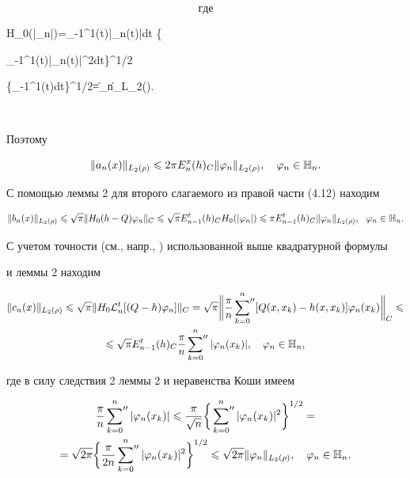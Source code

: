 $$


где


$$


H_0(|\vp_n|)=\int_{-1}^1\rho(t)|\vp_n(t)|dt \lea \bigg\{


\int_{-1}^{1}\rho(t)|\vp_n(t)|^2dt\bigg\}^{1/2}


\bigg\{\int_{-1}^1\rho(t)dt\bigg\}^{1/2}=\sqrt{\pi}\|\vp_n\|_{L_2(\rho)}.


$$


Поэтому


\begin{equation}


\|a_n(x)\|_{L_2(\rho)} \lea 2\pi E_n^x(h)_C\|\vp_n\|_{L_2(\rho)},\quad \vp_n\in \bH_n.


\end{equation}


С помощью леммы 2 для второго слагаемого из правой части (4.12) находим


\begin{equation}


\|b_n(x)\|_{L_2(\rho)}\lea \sqrt{\pi}\|H_0(h-Q)\vp_n\|_C\lea


\sqrt{\pi}E_{n-1}^t(h)_C H_0(|\vp_n|)\lea \pi E_{n-1}^t(h)_C


\|\vp_n\|_{L_2(\rho)},\ \ \vp_n\in \bH_n.


\end{equation}


С учетом точности (см., напр., \cite{9}) использованной выше квадратурной формулы 


и леммы 2 находим


\begin{multline*}


\|c_n(x)\|_{L_2(\rho)} \lea \sqrt{\pi}\|H_0\rL_n^t[(Q-h)\vp_n]\|_C=


\sqrt{\pi}\bigg\|\frac{\pi}{n}\sideset{}{''}\sum_{k=0}^n


[Q(x,x_k)-h(x,x_k)]\vp_n(x_k)\bigg\|_C\lea \\ \lea


\sqrt{\pi}E_{n-1}^t(h)_C \frac{\pi}{n}\sideset{}{''}\sum_{k=0}^n


|\vp_n(x_k)|,\quad \vp_n\in \bH_n,


\end{multline*}


где в силу следствия 2 леммы 2 и неравенства Коши имеем


\begin{gather*}


\frac{\pi}{n}\sideset{}{''}\sum_{k=0}^n |\vp_n(x_k)|\lea


\frac{\pi}{\sqrt{n}}\bigg\{\sideset{}{''}\sum_{k=0}^n


|\vp_n(x_k)|^2\bigg\}^{1/2}=\\


%


=\sqrt{2\pi}\bigg\{\frac{\pi}{2n}\sideset{}{''}\sum_{k=0}^n


|\vp_n(x_k)|^2\bigg\}^{1/2}\lea \sqrt{2\pi}\|\vp_n\|_{L_2(\rho)},


\quad \vp_n\in \bH_n.


\end{gather*}


